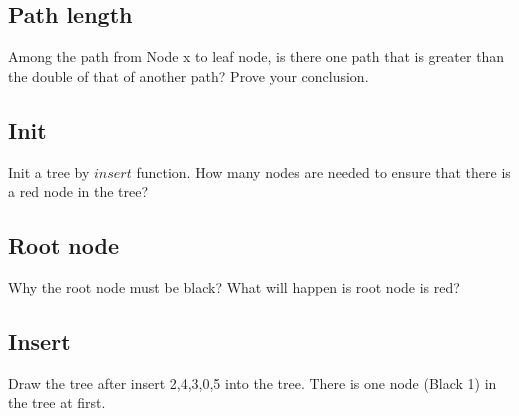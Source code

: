 \documentclass[11pt]{exam}
\begin{document}
\subsection{Path length}
Among the path from Node x to leaf node, is there one path that is greater than the double of that of another path? Prove your conclusion.
\begin{solution}
\end{solution}
\subsection{Init}
Init a tree by $insert$ function. How many nodes are needed to ensure that there is a red node in the tree?
\begin{solution}
\end{solution}
\subsection{Root node}
Why the root node must be black? What will happen is root node is red?
\begin{solution}
\end{solution}
\subsection{Insert}
Draw the tree after insert 2,4,3,0,5 into the tree. There is one node (Black 1) in the tree at first.
\begin{solution}
\end{solution}
\end{document}
